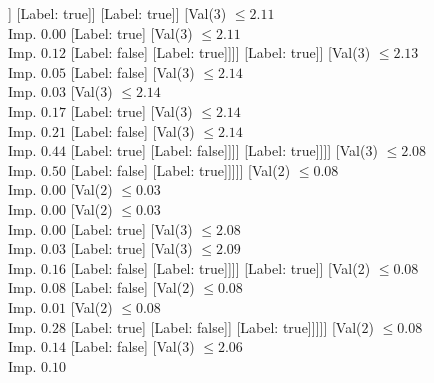 \documentclass[margin=10pt]{standalone}
\begin{document}
\begin{forest}
											[Val($3$) $ \leq 2.09$ \\ Imp. $0.00$
												[Val($3$) $ \leq 2.09$ \\ Imp. $0.04$
													[Val($3$) $ \leq 2.08$ \\ Imp. $0.01$
														[Val($3$) $ \leq 2.08$ \\ Imp. $0.09$
															[Label: true]
															[Label: false]]
														[Label: true]]
													[Label: true]]
												[Val($3$) $ \leq 2.11$ \\ Imp. $0.00$
													[Label: true]
													[Val($3$) $ \leq 2.11$ \\ Imp. $0.12$
														[Label: false]
														[Label: true]]]]
											[Label: true]]
										[Val($3$) $ \leq 2.13$ \\ Imp. $0.05$
											[Label: false]
											[Val($3$) $ \leq 2.14$ \\ Imp. $0.03$
												[Val($3$) $ \leq 2.14$ \\ Imp. $0.17$
													[Label: true]
													[Val($3$) $ \leq 2.14$ \\ Imp. $0.21$
														[Label: false]
														[Val($3$) $ \leq 2.14$ \\ Imp. $0.44$
															[Label: true]
															[Label: false]]]]
												[Label: true]]]]
									[Val($3$) $ \leq 2.08$ \\ Imp. $0.50$
										[Label: false]
										[Label: true]]]]]
						[Val($2$) $ \leq 0.08$ \\ Imp. $0.00$
							[Val($2$) $ \leq 0.03$ \\ Imp. $0.00$
								[Val($2$) $ \leq 0.03$ \\ Imp. $0.00$
									[Label: true]
									[Val($3$) $ \leq 2.08$ \\ Imp. $0.03$
										[Label: true]
										[Val($3$) $ \leq 2.09$ \\ Imp. $0.16$
											[Label: false]
											[Label: true]]]]
								[Label: true]]
							[Val($2$) $ \leq 0.08$ \\ Imp. $0.08$
								[Label: false]
								[Val($2$) $ \leq 0.08$ \\ Imp. $0.01$
									[Val($2$) $ \leq 0.08$ \\ Imp. $0.28$
										[Label: true]
										[Label: false]]
									[Label: true]]]]]
					[Val($2$) $ \leq 0.08$ \\ Imp. $0.14$
						[Label: false]
						[Val($3$) $ \leq 2.06$ \\ Imp. $0.10$

\end{forest}
\end{document}
